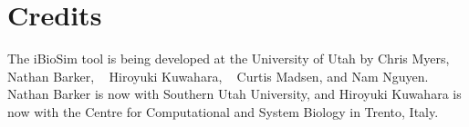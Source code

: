 \documentclass[titlepage,11pt]{article}
\begin{document}
\section{Credits}

\noindent
The iBioSim tool is being developed at the University of Utah
by 
Chris Myers,
~
Nathan Barker,
~
Hiroyuki Kuwahara,
~
Curtis Madsen,
and
Nam Nguyen.
Nathan Barker is now with Southern Utah University, and Hiroyuki
Kuwahara is now with the Centre for Computational and System
Biology in Trento, Italy. 
  
\end{document}
